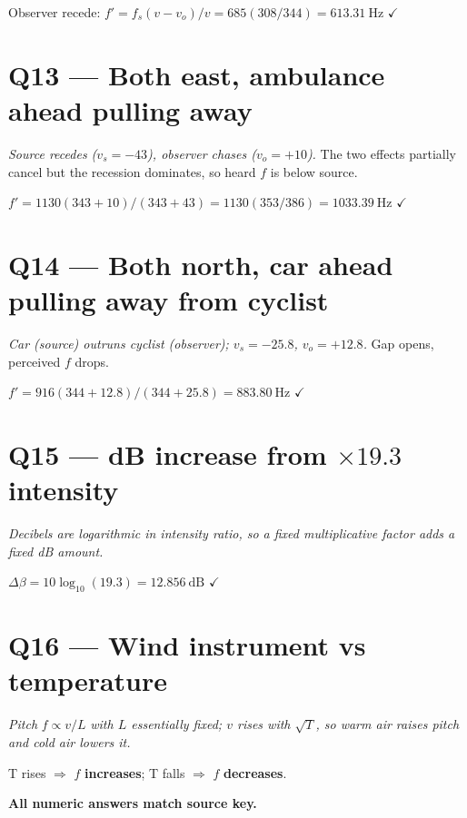 \documentclass[11pt]{article}
\newcommand{\checkmk}{\ensuremath{\checkmark}}
\begin{document}
Observer recede: $f' = f_s(v-v_o)/v = 685(308/344) = \boxed{613.31\ \text{Hz}}$ \checkmk

\section*{Q13 --- Both east, ambulance ahead pulling away}
\emph{Source recedes ($v_s=-43$), observer chases ($v_o=+10$).} The two effects partially cancel but the recession dominates, so heard $f$ is below source.

$f' = 1130(343+10)/(343+43) = 1130(353/386) = \boxed{1033.39\ \text{Hz}}$ \checkmk

\section*{Q14 --- Both north, car ahead pulling away from cyclist}
\emph{Car (source) outruns cyclist (observer); $v_s=-25.8$, $v_o=+12.8$.} Gap opens, perceived $f$ drops.

$f' = 916(344+12.8)/(344+25.8) = \boxed{883.80\ \text{Hz}}$ \checkmk

\section*{Q15 --- dB increase from $\times 19.3$ intensity}
\emph{Decibels are logarithmic in intensity ratio, so a fixed multiplicative factor adds a fixed dB amount.}

$\Delta\beta = 10\log_{10}(19.3) = \boxed{12.856\ \text{dB}}$ \checkmk

\section*{Q16 --- Wind instrument vs temperature}
\emph{Pitch} $f\propto v/L$ \emph{with $L$ essentially fixed; $v$ rises with $\sqrt{T}$, so warm air raises pitch and cold air lowers it.}

T rises $\Rightarrow$ $f$ \textbf{increases}; T falls $\Rightarrow$ $f$ \textbf{decreases}.

\bigskip\noindent\textbf{All numeric answers match source key.}
\end{document}
